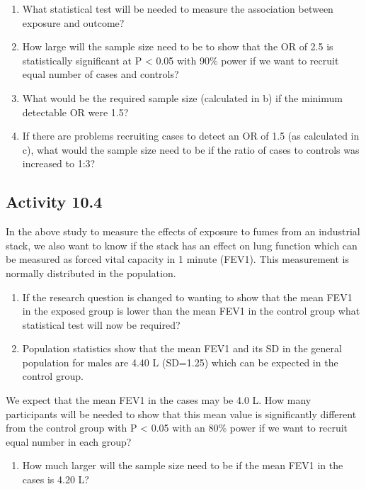 \documentclass[
]{memoir}
\providecommand{\tightlist}{%
  \setlength{\itemsep}{0pt}\setlength{\parskip}{0pt}}
\begin{document}
\begin{enumerate}
\def\labelenumi{\alph{enumi})}
\tightlist
\item
  What statistical test will be needed to measure the association between exposure and outcome?
\item
  How large will the sample size need to be to show that the OR of 2.5 is statistically significant at P \textless{} 0.05 with 90\% power if we want to recruit equal number of cases and controls?
\item
  What would be the required sample size (calculated in b) if the minimum detectable OR were 1.5?
\item
  If there are problems recruiting cases to detect an OR of 1.5 (as calculated in c), what would the sample size need to be if the ratio of cases to controls was increased to 1:3?
\end{enumerate}

\hypertarget{activity-10.4}{%
\subsection*{Activity 10.4}\label{activity-10.4}}

In the above study to measure the effects of exposure to fumes from an industrial stack, we also want to know if the stack has an effect on lung function which can be measured as forced vital capacity in 1 minute (FEV1). This measurement is normally distributed in the population.

\begin{enumerate}
\def\labelenumi{\alph{enumi})}
\tightlist
\item
  If the research question is changed to wanting to show that the mean FEV1 in the exposed group is lower than the mean FEV1 in the control group what statistical test will now be required?
\item
  Population statistics show that the mean FEV1 and its SD in the general population for males are 4.40 L (SD=1.25) which can be expected in the control group.
\end{enumerate}

We expect that the mean FEV1 in the cases may be 4.0 L.
How many participants will be needed to show that this mean value is significantly different from the control group with P \textless{} 0.05 with an 80\% power if we want to recruit equal number in each group?

\begin{enumerate}
\def\labelenumi{\alph{enumi})}
\setcounter{enumi}{2}
\tightlist
\item
  How much larger will the sample size need to be if the mean FEV1 in the cases is 4.20 L?
\end{enumerate}

  
\end{document}
